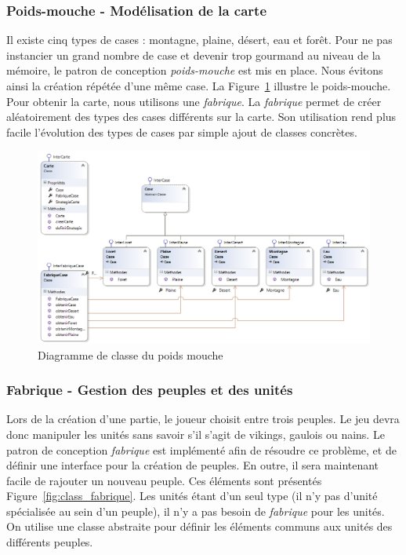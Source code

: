 \documentclass[a4paper]{article}%
\begin{document}
\subsubsection{Poids-mouche - Modélisation de la carte}
 Il existe cinq types de cases : montagne, plaine, désert, eau et forêt.
Pour ne pas instancier un grand nombre de case et devenir trop gourmand au niveau de la mémoire, le patron de conception \textit{poids-mouche} est mis en place. Nous évitons ainsi la création répétée d'une même case. La Figure~\ref{fig:class_poidsmouche} illustre le poids-mouche. Pour obtenir la carte,  nous utilisons une \textit{fabrique}. La \textit{fabrique} permet de créer aléatoirement des types des cases différents sur la carte.
Son utilisation rend plus facile l'évolution des types de cases par simple ajout de classes concrètes.

\begin{figure}[H]
    \centering
    \includegraphics[width=\textwidth]{./images/classe/poidsmouche.png}
		\caption{Diagramme de classe du poids mouche}
		\label{fig:class_poidsmouche}
\end{figure}

\subsubsection{Fabrique - Gestion des peuples et des unités}

Lors de la création d'une partie, le joueur choisit entre trois peuples. Le jeu devra donc manipuler les unités sans savoir s'il s'agit de vikings, gaulois ou nains. Le patron de conception \textit{fabrique} est implémenté afin de résoudre ce problème, et de définir une interface pour la création de peuples. En outre, il sera maintenant facile de rajouter un nouveau peuple. Ces éléments sont présentés Figure~\ref{fig:class_fabrique}.
Les unités étant d'un seul type (il n'y pas d'unité spécialisée au sein d'un peuple), il n'y a pas besoin de \textit{fabrique} pour les unités. On utilise une classe abstraite pour définir les éléments communs aux unités des différents peuples. 
\end{document}
